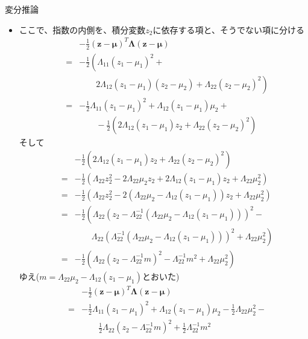 \documentclass[dvipdfmx,notheorems,t]{beamer}
\begin{document}
\begin{frame}{変分推論}
\begin{itemize}
\begin{itemize}
		\item ここで、指数の内側を、積分変数$z_2$に依存する項と、そうでない項に分ける
		\begin{eqnarray}
			&& -\frac{1}{2} (\bm{z} - \bm{\mu})^T \bm{\Lambda} (\bm{z} - \bm{\mu}) \nonumber \\
			&=& -\frac{1}{2} \left( \Lambda_{11} (z_1 - \mu_1)^2 + \right. \nonumber \\
			&& \qquad \left. 2 \Lambda_{12} (z_1 - \mu_1)(z_2 - \mu_2) + \Lambda_{22} (z_2 - \mu_2)^2 \right) \\
			&=& -\frac{1}{2} \Lambda_{11} (z_1 - \mu_1)^2 + \Lambda_{12} (z_1 - \mu_1) \mu_2 + \nonumber \\
			&& \qquad -\frac{1}{2} \left( 2 \Lambda_{12} (z_1 - \mu_1) z_2 + \Lambda_{22} (z_2 - \mu_2)^2 \right)
		\end{eqnarray}
		そして
		\begin{eqnarray}
			&& -\frac{1}{2} \left( 2 \Lambda_{12} (z_1 - \mu_1) z_2 + \Lambda_{22} (z_2 - \mu_2)^2 \right) \nonumber \\
			&=& -\frac{1}{2} \left( \Lambda_{22} z_2^2 - 2 \Lambda_{22} \mu_2 z_2 + 2 \Lambda_{12} (z_1 - \mu_1) z_2 + \Lambda_{22} \mu_2^2 \right) \\
			&=& -\frac{1}{2} \left( \Lambda_{22} z_2^2 - 2 \left( \Lambda_{22} \mu_2 - \Lambda_{12} (z_1 - \mu_1) \right) z_2 + \Lambda_{22} \mu_2^2 \right) \\
			&=& -\frac{1}{2} \left( \Lambda_{22} \left( z_2 - \Lambda_{22}^{-1} \left( \Lambda_{22} \mu_2 - \Lambda_{12} (z_1 - \mu_1) \right) \right)^2 - \right. \nonumber \\
			&& \qquad \left. \Lambda_{22} \left( \Lambda_{22}^{-1} \left( \Lambda_{22} \mu_2 - \Lambda_{12} (z_1 - \mu_1) \right) \right)^2 + \Lambda_{22} \mu_2^2 \right) \\
			&=& -\frac{1}{2} \left( \Lambda_{22} \left( z_2 - \Lambda_{22}^{-1} m \right)^2 - \Lambda_{22}^{-1} m^2 + \Lambda_{22} \mu_2^2 \right)
		\end{eqnarray}
		ゆえ($m = \Lambda_{22} \mu_2 - \Lambda_{12} (z_1 - \mu_1)$とおいた)
		\begin{eqnarray}
			&& -\frac{1}{2} (\bm{z} - \bm{\mu})^T \bm{\Lambda} (\bm{z} - \bm{\mu}) \nonumber \\
			&=& -\frac{1}{2} \Lambda_{11} (z_1 - \mu_1)^2 + \Lambda_{12} (z_1 - \mu_1) \mu_2 - \frac{1}{2} \Lambda_{22} \mu_2^2 - \nonumber \\
			&& \qquad \frac{1}{2} \Lambda_{22} \left( z_2 - \Lambda_{22}^{-1} m \right)^2 + \frac{1}{2} \Lambda_{22}^{-1} m^2
		\end{eqnarray}
		

\end{itemize}
\end{itemize}
\end{frame}
\end{document}
